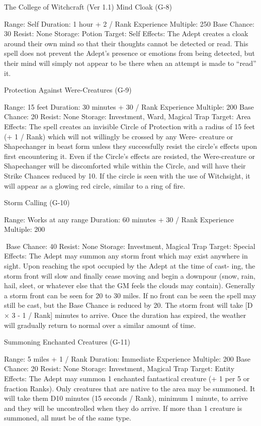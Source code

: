 \begin{Chapter}{The College of Witchcraft (Ver 1.1)}
Mind Cloak (G-8) 

Range: Self 
Duration: 1 hour + 2 / Rank 
Experience Multiple: 250 
Base Chance: 30%
Resist: None 
Storage: Potion 
Target: Self 
Effects:  The  Adept  creates  a  cloak  around  their 
own mind so that their thoughts cannot be detected 
or  read.  This  spell  does  not  prevent  the  Adept’s 
presence or emotions from being detected, but their 
mind  will  simply  not  appear  to  be  there  when  an 
attempt is made to “read” it. 

Protection Against Were-Creatures (G-9) 

Range: 15 feet 
Duration: 30 minutes + 30 / Rank 
Experience Multiple: 200 
Base Chance: 20%
Resist: None 
Storage: Investment, Ward, Magical Trap 
Target: Area 
Effects:  The  spell  creates  an  invisible  Circle  of 
Protection  with  a  radius  of  15  feet  (+  1  /  Rank) 
which  will  not  willingly  be  crossed  by  any  Were-
creature or Shapechanger in beast form unless they 
successfully  resist  the  circle’s  effects  upon  first 
encountering  it.  Even  if  the  Circle’s  effects  are 
resisted,  the  Were-creature  or  Shapechanger  will 
be  discomforted  while  within  the  Circle,  and  will 
have  their  Strike  Chances  reduced  by  10.  If  the 
circle  is  seen  with  the  use  of  Witchsight,  it  will 
appear as a glowing red circle, similar to a ring of 
fire. 

Storm Calling (G-10) 

Range: Works at any range 
Duration: 60 minutes + 30 / Rank 
Experience Multiple: 200 

Base Chance: 40%
Resist: None 
Storage: Investment, Magical Trap 
Target: Special 
Effects:  The  Adept  may  summon  any  storm  front 
which may exist anywhere in sight. Upon reaching 
the spot occupied by the Adept at the time of cast-
ing,  the  storm  front  will  slow  and  finally  cease 
moving  and  begin  a  downpour  (snow,  rain,  hail, 
sleet, or whatever else that the GM feels the clouds 
may  contain).  Generally  a  storm front  can be  seen 
for 20 to 30 miles. If no front can be seen the spell 
may  still  be  cast,  but  the  Base  Chance  is  reduced 
by 20. The storm front will take [D × 3 - 1 / Rank] 
minutes  to  arrive.  Once  the  duration  has  expired, 
the  weather  will  gradually  return to  normal  over  a 
similar amount of time. 

Summoning Enchanted Creatures (G-11) 

Range: 5 miles + 1 / Rank 
Duration: Immediate 
Experience Multiple: 200 
Base Chance: 20%
Resist: None 
Storage: Investment, Magical Trap 
Target: Entity 
Effects:  The  Adept  may  summon  1  enchanted 
fantastical  creature  (+  1  per  5  or  fraction  Ranks). 
Only  creatures  that  are  native  to  the  area  may  be 
summoned.  It  will  take  them  D10  minutes  (15 
seconds / Rank), minimum 1 minute, to arrive and 
they  will  be  uncontrolled  when  they  do  arrive.  If 
more  than  1  creature  is  summoned,  all  must  be  of 
the same type. 


\end{Chapter}
